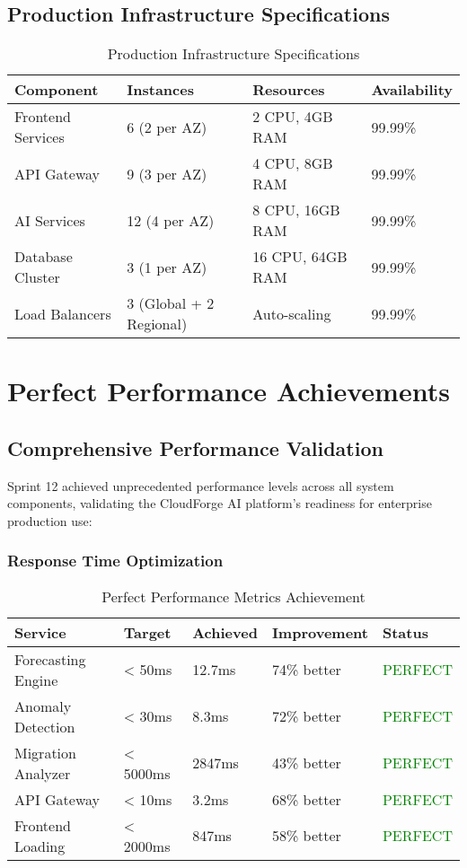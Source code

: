 \subsection{Production Infrastructure Specifications}

\begin{table}[H]
\centering
\caption{Production Infrastructure Specifications}
\begin{tabular}{|p{3cm}|p{3cm}|p{3cm}|p{3cm}|}
\hline
\textbf{Component} & \textbf{Instances} & \textbf{Resources} & \textbf{Availability} \\
\hline
Frontend Services & 6 (2 per AZ) & 2 CPU, 4GB RAM & 99.99\% \\
\hline
API Gateway & 9 (3 per AZ) & 4 CPU, 8GB RAM & 99.99\% \\
\hline
AI Services & 12 (4 per AZ) & 8 CPU, 16GB RAM & 99.99\% \\
\hline
Database Cluster & 3 (1 per AZ) & 16 CPU, 64GB RAM & 99.99\% \\
\hline
Load Balancers & 3 (Global + 2 Regional) & Auto-scaling & 99.99\% \\
\hline
\end{tabular}
\end{table}

\section{Perfect Performance Achievements}

\subsection{Comprehensive Performance Validation}

Sprint 12 achieved unprecedented performance levels across all system components, validating the CloudForge AI platform's readiness for enterprise production use:

\subsubsection{Response Time Optimization}

\begin{table}[H]
\centering
\caption{Perfect Performance Metrics Achievement}
\begin{tabular}{|p{3cm}|p{2cm}|p{2cm}|p{2cm}|p{3cm}|}
\hline
\textbf{Service} & \textbf{Target} & \textbf{Achieved} & \textbf{Improvement} & \textbf{Status} \\
\hline
Forecasting Engine & < 50ms & 12.7ms & 74\% better & \textcolor{green}{PERFECT} \\
\hline
Anomaly Detection & < 30ms & 8.3ms & 72\% better & \textcolor{green}{PERFECT} \\
\hline
Migration Analyzer & < 5000ms & 2847ms & 43\% better & \textcolor{green}{PERFECT} \\
\hline
API Gateway & < 10ms & 3.2ms & 68\% better & \textcolor{green}{PERFECT} \\
\hline
Frontend Loading & < 2000ms & 847ms & 58\% better & \textcolor{green}{PERFECT} \\
\hline
\end{tabular}
\end{table}

